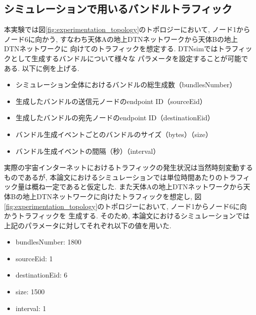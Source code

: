 \subsection{シミュレーションで用いるバンドルトラフィック}
\label{section:シミュレーションで用いるバンドルトラフィック}
本実験では図\ref{fig:experimentation_topology}のトポロジーにおいて, 
ノード1からノード6に向かう, すなわち天体Aの地上DTNネットワークから天体Bの地上DTNネットワークに
向けてのトラフィックを想定する. DTNsimではトラフィックとして生成するバンドルについて様々な
パラメータを設定することが可能である. 以下に例を上げる. 
\begin{itemize}
    \item シミュレーション全体におけるバンドルの総生成数（bundlesNumber）
    \item 生成したバンドルの送信元ノードのendpoint ID（sourceEid）
    \item 生成したバンドルの宛先ノードのendpoint ID（destinationEid）
    \item バンドル生成イベントごとのバンドルのサイズ（bytes）（size）
    \item バンドル生成イベントの間隔（秒）（interval）
\end{itemize}
実際の宇宙インターネットにおけるトラフィックの発生状況は当然時刻変動するものであるが, 
本論文におけるシミュレーションでは単位時間あたりのトラフィック量は概ね一定であると仮定した. 
また天体Aの地上DTNネットワークから天体Bの地上DTNネットワークに向けたトラフィックを想定し, 
図\ref{fig:experimentation_topology}のトポロジーにおいて, ノード1からノード6に向かうトラフィックを
生成する. そのため, 本論文におけるシミュレーションでは上記のパラメータに対してそれぞれ以下の値を用いた. 
\begin{itemize}
    \item bundlesNumber: 1800
    \item sourceEid: 1
    \item destinationEid: 6
    \item size: 1500
    \item interval: 1
\end{itemize}
